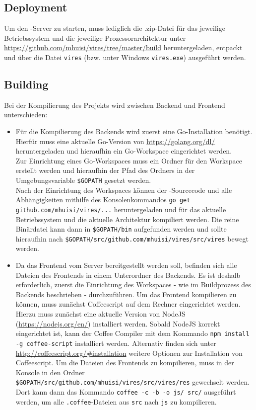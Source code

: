 \subsection{Deployment}
Um den \vires-Server zu starten, muss lediglich die .zip-Datei für das jeweilige Betriebssystem und die jeweilige Prozessorarchitektur unter 
\url{https://github.com/mhuisi/vires/tree/master/build} heruntergeladen, entpackt und über die Datei \verb+vires+ (bzw. unter Windows \verb+vires.exe+) ausgeführt werden.

\subsection{Building}
Bei der Kompilierung des Projekts wird zwischen Backend und Frontend unterschieden:
\begin{itemize}
	\item Für die Kompilierung des Backends wird zuerst eine Go-Installation benötigt.\\
	Hierfür muss eine aktuelle Go-Version von \url{https://golang.org/dl/} heruntergeladen und hieraufhin ein Go-Workspace eingerichtet werden.\\
	Zur Einrichtung eines Go-Workspaces muss ein Ordner für den Workspace erstellt werden und hieraufhin der Pfad des Ordners in der Umgebungsvariable 
	\verb+$GOPATH+ gesetzt werden.\\
	Nach der Einrichtung des Workspaces können der \vires-Sourcecode und alle Abhängigkeiten mithilfe des Konsolenkommandos
	\verb+go get github.com/mhuisi/vires/...+ heruntergeladen und für das aktuelle Betriebssystem und die aktuelle Architektur kompiliert werden. 
	Die reine Binärdatei kann dann in \verb+$GOPATH/bin+ aufgefunden werden und sollte hieraufhin nach
	\verb+$GOPATH/src/github.com/mhuisi/vires/src/vires+ bewegt werden.
	\item Da das Frontend vom Server bereitgestellt werden soll, befinden sich alle Dateien des Frontends in einem Unterordner des Backends. Es ist deshalb erforderlich, zuerst die Einrichtung des Workspaces - wie im Buildprozess des Backends beschrieben - durchzuführen.
	Um das Frontend kompilieren zu können, muss zunächst Coffeescript auf dem Rechner eingerichtet werden. Hierzu muss zunächst eine aktuelle Version von NodeJS (\url{https://nodejs.org/en/}) installiert werden. Sobald NodeJS korrekt eingerichtet ist, kann der Coffee Compiler mit dem Kommando \verb+npm install -g coffee-script+ installiert werden. Alternativ finden sich unter \url{http://coffeescript.org/\#installation} weitere Optionen zur Installation von Coffeescript.
	Um die Dateien des Frontends zu kompilieren, muss in der Konsole in den Ordner \verb+$GOPATH/src/github.com/mhuisi/vires/src/vires/res+ gewechselt werden. Dort kann dann das Kommando \verb+coffee -c -b -o js/ src/+ ausgeführt werden, um alle \verb+.coffee+-Dateien aus \verb+src+ nach \verb+js+ zu kompilieren.
\end{itemize}